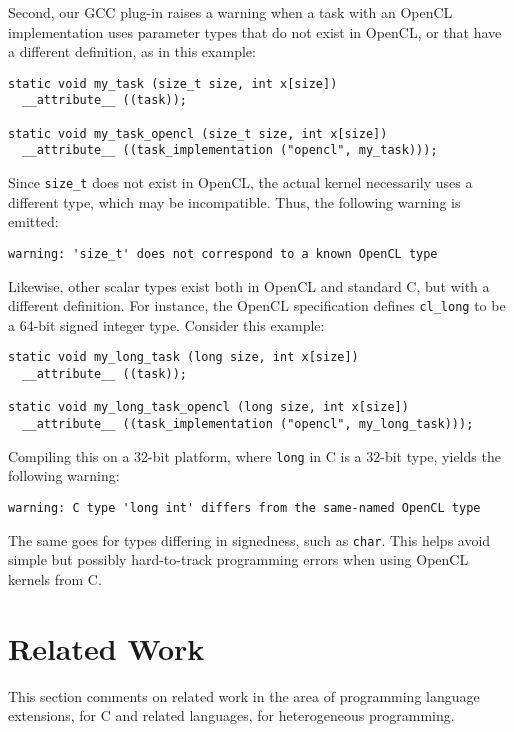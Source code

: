 \documentclass[twoside, a4paper, 10pt]{article}
\begin{document}
Second, our GCC plug-in raises a warning when a task with an OpenCL
implementation uses parameter types that do not exist in OpenCL, or that
have a different definition, as in this example:


\begin{verbatim}
static void my_task (size_t size, int x[size])
  __attribute__ ((task));

static void my_task_opencl (size_t size, int x[size])
  __attribute__ ((task_implementation ("opencl", my_task)));
\end{verbatim}

Since \texttt{size\_t} does not exist in OpenCL, the actual kernel necessarily
uses a different type, which may be incompatible.  Thus, the following
warning is emitted:


\begin{verbatim}
warning: 'size_t' does not correspond to a known OpenCL type
\end{verbatim}

Likewise, other scalar types exist both in OpenCL and standard C, but
with a different definition.  For instance, the OpenCL specification
defines \texttt{cl\_long} to be a 64-bit signed integer type.  Consider this
example:


\begin{verbatim}
static void my_long_task (long size, int x[size])
  __attribute__ ((task));

static void my_long_task_opencl (long size, int x[size])
  __attribute__ ((task_implementation ("opencl", my_long_task)));
\end{verbatim}

Compiling this on a 32-bit platform, where \texttt{long} in C is a 32-bit type,
yields the following warning:


\begin{verbatim}
warning: C type 'long int' differs from the same-named OpenCL type
\end{verbatim}

The same goes for types differing in signedness, such as \texttt{char}.  This
helps avoid simple but possibly hard-to-track programming errors when
using OpenCL kernels from C.
\section{Related Work}
\label{sec-4}


This section comments on related work in the area of programming
language extensions, for C and related languages, for heterogeneous
programming.
\end{document}
